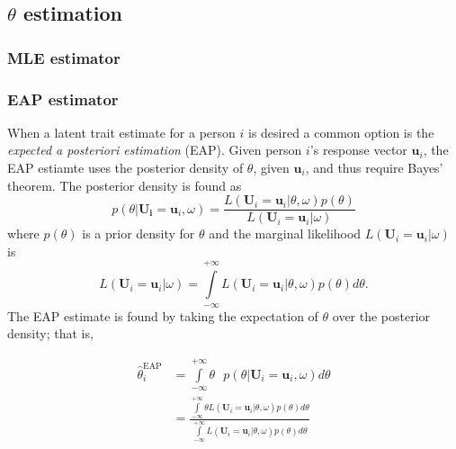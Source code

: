 \subsection{$\theta$ estimation}
\subsubsection{MLE estimator}
\subsubsection{EAP estimator}
When a latent trait estimate for a person $i$ is desired a common option is the \emph{expected a posteriori estimation} (EAP).
Given person $i$'s response vector $\mathbf{u}_i$, the EAP estiamte uses the posterior density of $\theta$, given $\mathbf{u}_i$, and thus require Bayes' theorem. The posterior density is found as
\begin{equation}
p(\theta | \mathbf{U_i}=\mathbf{u}_i,\omega)=\frac{L\left(\mathbf{U}_i=\mathbf{u}_i|\theta,\omega \right)p\left(\theta\right)}{L\left(\mathbf{U}_i=\mathbf{u}_i|\omega\right)}
\end{equation}
where $p\left(\theta\right)$ is a prior density for $\theta$ and the marginal likelihood $L\left(\mathbf{U}_i=\mathbf{u}_i|\omega\right)$ is
\begin{equation}
L\left(\mathbf{U}_i=\mathbf{u}_i|\omega\right)=\int\limits_{-\infty}^{+\infty}L\left(\mathbf{U}_i=\mathbf{u}_i|\theta,\omega\right)p\left(\theta\right)d\theta.
\end{equation}
The EAP estimate is found by taking the expectation of $\theta$ over the posterior density; that is,

\begin{subequations}\label{eq:eapest}
\begin{align}
\hat{\theta}^{\text{EAP}}_i&=\int\limits_{-\infty}^{+\infty}\theta\text{ }p\left(\theta |\mathbf{U}_i=\mathbf{u}_i,\omega \right)d\theta \\
&=\frac{\int\limits_{-\infty}^{+\infty}\theta L\left(\mathbf{U}_i=\mathbf{u}_i|\theta,\omega\right)p\left(\theta\right)d\theta}{\int\limits_{-\infty}^{+\infty}L\left(\mathbf{U}_i=\mathbf{u}_i|\theta,\omega\right)p\left(\theta\right)d\theta}
\end{align}
\end{subequations}


